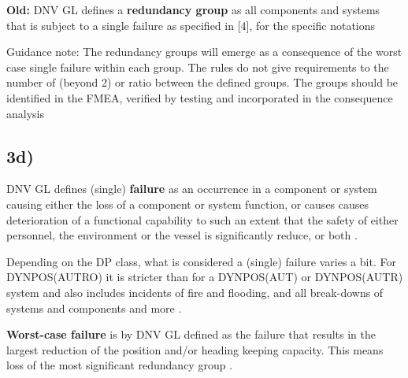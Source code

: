 \textbf{Old:}
DNV GL defines a \textbf{redundancy group} as all components and systems that is subject to a single failure as specified in [4], for the specific notations

Guidance note:
The redundancy groups will emerge as a consequence of the worst case single failure within each
group. The rules do not give requirements to the number of (beyond 2) or ratio between the
defined groups. The groups should be identified in the FMEA, verified by testing and incorporated in
the consequence analysis

    \begin{comment}
    \cite{RecommendedPractices_DP_DNVGL} page 26.
    
    There are three key elements in any redundancy concept:
    1) performance
    2) protection
    3) detection
    
    THEN THEY EXPLAIN EACH. SEE IF WE NEED TO INCLUDE THIS
    \end{comment}

\subsection*{3d)} \label{Sec:3d}

DNV GL defines (single) \textbf{failure} as an occurrence in a component or system causing either the loss of a component or system function, or causes causes deterioration of a functional capability to such an extent that the safety of either personnel, the environment or the vessel is significantly reduce, or both \cite{RulesShipsDNVGLPart6Chap3}.

Depending on the DP class, what is considered a (single) failure varies a bit. For DYNPOS(AUTRO) it is stricter than for a DYNPOS(AUT) or DYNPOS(AUTR) system and also includes incidents of fire and flooding, and all break-downs of systems and components and more \cite{RulesShipsDNVGLPart6Chap3}.

\textbf{Worst-case failure} is by DNV GL defined as the failure that results in the largest reduction of the position and/or heading keeping capacity. This means loss of the most significant redundancy group \cite{RulesShipsDNVGLPart6Chap3}.


